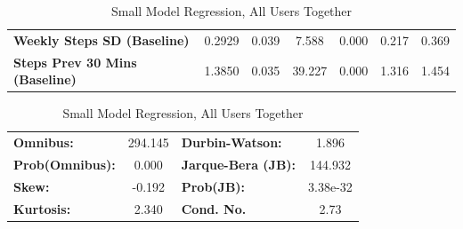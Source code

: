 \begin{table}
\begin{tabular}{lcccccc}
\textbf{Weekly Steps SD (Baseline)}    &       0.2929  &        0.039     &     7.588  &         0.000        &        0.217    &        0.369     \\
\textbf{Steps Prev 30 Mins (Baseline)} &       1.3850  &        0.035     &    39.227  &         0.000        &        1.316    &        1.454     \\
\bottomrule
\end{tabular}
\begin{tabular}{lclc}
\textbf{Omnibus:}       & 294.145 & \textbf{  Durbin-Watson:     } &    1.896  \\
\textbf{Prob(Omnibus):} &   0.000 & \textbf{  Jarque-Bera (JB):  } &  144.932  \\
\textbf{Skew:}          &  -0.192 & \textbf{  Prob(JB):          } & 3.38e-32  \\
\textbf{Kurtosis:}      &   2.340 & \textbf{  Cond. No.          } &     2.73  \\
\bottomrule
\end{tabular}
\caption{Small Model Regression, All Users Together}
\end{table}

\medskip


